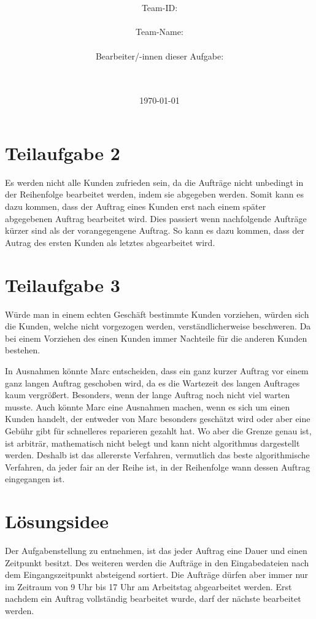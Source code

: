 \documentclass[a4paper,10pt,ngerman]{scrartcl}
\title{\textbf{\Huge\Aufgabe}}
\author{\LARGE Team-ID: \LARGE \TeamId \\\\
\LARGE Team-Name: \LARGE \TeamName \\\\
\LARGE Bearbeiter/-innen dieser Aufgabe: \\
\LARGE \Namen\\\\}
\date{\LARGE\today}
\begin{document}
\maketitle
\tableofcontents

\vspace{0.5cm}

\section{Teilaufgabe 2}\label{sec:begruendung2}
Es werden nicht alle Kunden zufrieden sein, da die Aufträge nicht unbedingt in der Reihenfolge bearbeitet werden, indem sie abgegeben werden. Somit kann es dazu kommen, dass der Auftrag eines Kunden erst nach einem später abgegebenen Auftrag bearbeitet wird. Dies passiert wenn nachfolgende Aufträge kürzer sind als der vorangegengene Auftrag.
So kann es dazu kommen, dass der Autrag des ersten Kunden als letztes abgearbeitet wird.

\section{Teilaufgabe 3}\label{sec:begruendung3 }
Würde man in einem echten Geschäft bestimmte Kunden vorziehen,
würden sich die Kunden, welche nicht vorgezogen werden, verständlicherweise beschweren.
Da bei einem Vorziehen des einen Kunden immer Nachteile für die anderen Kunden bestehen.

In Ausnahmen könnte Marc entscheiden, dass ein ganz kurzer Auftrag vor einem ganz langen Auftrag geschoben wird,
da es die Wartezeit des langen Auftrages kaum vergrößert.
Besonders, wenn der lange Auftrag noch nicht viel warten musste.
Auch könnte Marc eine Ausnahmen machen, wenn es sich um einen Kunden handelt, der entweder von Marc besonders geschätzt wird oder aber eine Gebühr gibt für schnelleres reparieren gezahlt hat.
Wo aber die Grenze genau ist, ist arbiträr, mathematisch nicht belegt und kann nicht algorithmus dargestellt werden.
Deshalb ist das allererste Verfahren, vermutlich das beste algorithmische Verfahren, da jeder fair an der Reihe ist,
in der Reihenfolge wann dessen Auftrag eingegangen ist.

\section{Lösungsidee}\label{sec:losungsidee}
Der Aufgabenstellung zu entnehmen, ist das jeder Auftrag eine Dauer und einen Zeitpunkt besitzt.
Des weiteren werden die Aufträge in den Eingabedateien
nach dem Eingangszeitpunkt absteigend sortiert.
Die Aufträge dürfen aber immer nur im Zeitraum von 9 Uhr bis 17 Uhr am Arbeitstag abgearbeitet werden.
Erst nachdem ein Auftrag vollständig bearbeitet wurde, darf der nächste bearbeitet werden.
\end{document}
